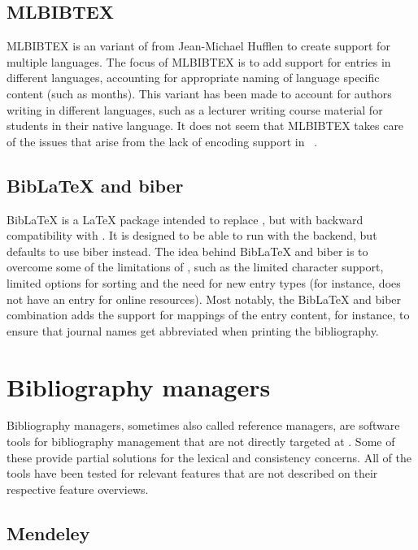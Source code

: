 \subsection{MLBIBTEX}
MLBIBTEX is an variant of {\bibtex} from Jean-Michael Hufflen to
create support for multiple languages.  The focus of MLBIBTEX is to
add support for entries in different languages, accounting for
appropriate naming of language specific content (such as months).
This variant has been made to account for authors writing in different
languages, such as a lecturer writing course material for students in
their native language.  It does not seem that MLBIBTEX takes care of
the issues that arise from the lack of encoding support in
{\bibtex}~\cite{hufflen2001_mlbibtex}.


\subsection{Bib{\LaTeX} and biber}
\label{sec:related_biblatex}

Bib{\LaTeX} is a {\LaTeX} package intended to replace {\bibtex}, but
with backward compatibility with {\bibtex}.  It is designed to be able
to run with the {\bibtex} backend, but defaults to use biber instead.
The idea behind Bib{\LaTeX} and biber is to overcome some of the
limitations of {\bibtex}, such as the limited character support,
limited options for sorting and the need for new entry types (for
instance, {\bibtex} does not have an entry for online resources).
Most notably, the Bib{\LaTeX} and biber combination adds the support
for mappings of the entry content, for instance, to ensure that journal
names get abbreviated when printing the bibliography.


\section{Bibliography managers}
\label{sec:bibliography_managers}

Bibliography managers, sometimes also called reference managers, are
software tools for bibliography management that are not directly
targeted at {\bibtex}.  Some of these provide partial solutions for
the lexical and consistency concerns.  All of the tools have been
tested for relevant features that are not described on their
respective feature overviews.

\subsection{Mendeley}
\label{sec:related_mendeley}

